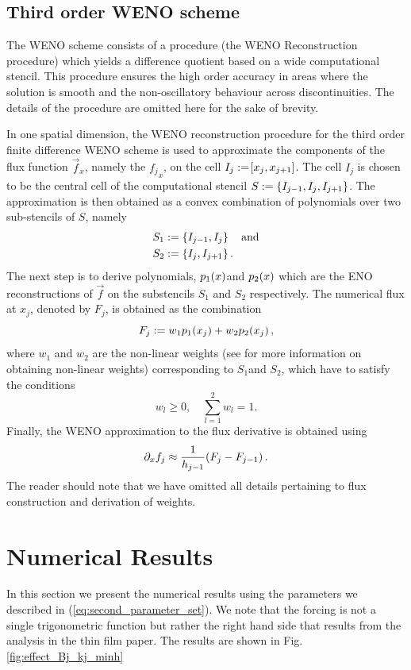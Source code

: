 \documentclass{amsart}
\theoremstyle{definition}
\theoremstyle{remark}
\numberwithin{equation}{section}
\begin{document}
\subsection{Third order WENO scheme}
The WENO scheme consists of a procedure (the WENO Reconstruction procedure) which yields a difference quotient based on a wide computational stencil.  This procedure ensures the high order accuracy in areas where the solution is smooth and the non-oscillatory behaviour across discontinuities.  The details of the procedure are omitted here for the sake of brevity.  

In one spatial dimension, the WENO reconstruction procedure for the third order finite difference WENO scheme is used to approximate the components of the flux function $\vec{f}_x$, namely the $ {f_j}_x$, on the cell $I_j:=\!\left[{x_j, x_{j+1}}\right]$.  The cell $I_j$ is chosen to be the central cell of the computational stencil $S:=\left\lbrace I_{j-1}, I_j, I_{j+1}\right\rbrace$.  The approximation is then obtained as a convex combination of polynomials over two sub-stencils of $S$, namely 
\begin{equation}
\begin{aligned}
S_1&:=\left\lbrace I_{j-1}, I_j\right\rbrace\quad \text{and}\\
S_2&:=\left\lbrace I_{j}, I_{j+1}\right\rbrace.
\end{aligned}
\end{equation}
The next step is to derive polynomials, $p_1\!\left({x}\right)$and
$p_2\!\left({x}\right)$ which are the ENO reconstructions of $\vec f$
on the substencils $S_1$ and $S_2$
respectively.  The numerical flux at $x_{j}$, denoted by
$F_{j}$, is obtained as the combination
\begin{equation}\label{eq_f_WENO}
F_{j}:=w_1p_1\!\left({x_{j}}\right) +w_2p_2\!\left({x_{j}}\right),
\end{equation}
where $w_1$ and $w_2$ are the non-linear weights (see \cite{shu1998essentially} for more information on obtaining non-linear weights) corresponding to $S_1$and $S_2$, which have to satisfy the conditions
\begin{equation}
w_l\geq 0,\quad \sum_{l=1}^2 w_l = 1.
\end{equation}
Finally, the WENO approximation to the flux derivative is obtained using
\begin{equation}\label{eq_WENO_approx_flux_derivative}
\partial_x f_j\approx \frac{1}{h_{j-1}}\!\left({F_{j}- F_{j-1}}\right).
\end{equation}
The reader should note that we have omitted all details pertaining to flux construction and derivation of weights. 
\section{Numerical Results}
In this section we present the numerical results using the parameters we described in (\ref{eq:second_parameter_set}).  We note that the forcing is not a single trigonometric function but rather the right hand side that results from the analysis in the thin film paper. The results are shown in Fig. \ref{fig:effect_Bj_kj_minh}
\end{document}
